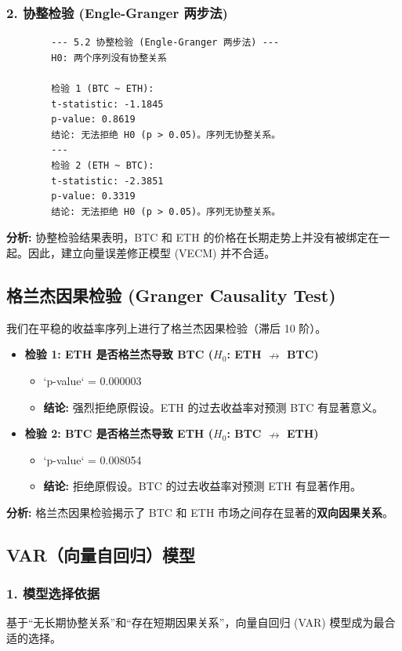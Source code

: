 \documentclass[a4paper]{ctexart}
\begin{document}
	\subsubsection{2. 协整检验 (Engle-Granger 两步法)}
	\begin{verbatim}
		--- 5.2 协整检验 (Engle-Granger 两步法) ---
		H0: 两个序列没有协整关系
		
		检验 1 (BTC ~ ETH):
		t-statistic: -1.1845
		p-value: 0.8619
		结论: 无法拒绝 H0 (p > 0.05)。序列无协整关系。
		---
		检验 2 (ETH ~ BTC):
		t-statistic: -2.3851
		p-value: 0.3319
		结论: 无法拒绝 H0 (p > 0.05)。序列无协整关系。
	\end{verbatim}
	\textbf{分析:} 协整检验结果表明，BTC 和 ETH 的价格在长期走势上并没有被绑定在一起。因此，建立向量误差修正模型 (VECM) 并不合适。
	
	\subsection{格兰杰因果检验 (Granger Causality Test)}
	我们在平稳的收益率序列上进行了格兰杰因果检验（滞后 10 阶）。
	\begin{itemize}
		\item \textbf{检验 1: ETH 是否格兰杰导致 BTC ($H_0$: ETH $\nrightarrow$ BTC)}
		\begin{itemize}
			\item `p-value` = 0.000003
			\item \textbf{结论:} 强烈拒绝原假设。ETH 的过去收益率对预测 BTC 有显著意义。
		\end{itemize}
		\item \textbf{检验 2: BTC 是否格兰杰导致 ETH ($H_0$: BTC $\nrightarrow$ ETH)}
		\begin{itemize}
			\item `p-value` = 0.008054
			\item \textbf{结论:} 拒绝原假设。BTC 的过去收益率对预测 ETH 有显著作用。
		\end{itemize}
	\end{itemize}
	\textbf{分析:} 格兰杰因果检验揭示了 BTC 和 ETH 市场之间存在显著的\textbf{双向因果关系}。
	
	\subsection{VAR（向量自回归）模型}
	\subsubsection{1. 模型选择依据}
	基于“无长期协整关系”和“存在短期因果关系”，向量自回归 (VAR) 模型成为最合适的选择。
	
\end{document}
